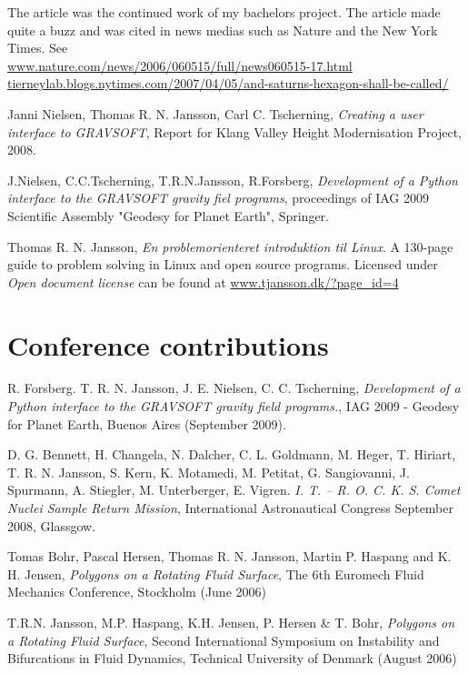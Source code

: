 \documentclass[margin,line,a4paper]{resume05}
\begin{document}
\begin{resume}
    The article was the continued work of my bachelors project. The
    article made quite a buzz and was cited in news medias such as Nature
    and the New York Times. See\\
    \href{http://www.nature.com/news/2006/060515/full/news060515-17.html}{www.nature.com/news/2006/060515/full/news060515-17.html}\\
    \href{http://tierneylab.blogs.nytimes.com/2007/04/05/and-saturns-hexagon-shall-be-called/}{tierneylab.blogs.nytimes.com/2007/04/05/and-saturns-hexagon-shall-be-called/}
    
    Janni Nielsen, Thomas R. N. Jansson, Carl C. Tscherning, \emph{Creating a user
    interface to GRAVSOFT}, Report for Klang Valley Height Modernisation
    Project, 2008. 
    
    J.Nielsen, C.C.Tscherning, T.R.N.Jansson, R.Forsberg,
    \emph{Development of a Python interface to the GRAVSOFT gravity
    fiel programs}, proceedings of IAG 2009 Scientific Assembly
    "Geodesy for Planet Earth", Springer. 
    
    Thomas R. N. Jansson, \emph{En problemorienteret introduktion til Linux}. A
    130-page guide to problem solving in Linux and open source programs. Licensed
    under \textit{Open document license} can be found at \url{www.tjansson.dk/?page_id=4}    


\section{ \mysidestyle Conference contributions}
    R. Forsberg. T. R. N. Jansson, J. E. Nielsen, C. C. Tscherning,
    \emph{Development of a Python interface to the GRAVSOFT gravity field
    programs.}, IAG 2009 - Geodesy for Planet Earth, Buenos Aires
    (September 2009).  

    D. G. Bennett, H. Changela, N. Dalcher, C. L. Goldmann, M. Heger, T.
    Hiriart, T. R. N. Jansson, S. Kern, K. Motamedi, M. Petitat, G.
    Sangiovanni, J. Spurmann, A. Stiegler, M. Unterberger, E. Vigren.
    \emph{I. T. -- R. O. C. K. S. Comet Nuclei Sample Return Mission}, International
    Astronautical Congress September 2008, Glassgow. 

    Tomas Bohr, Pascal Hersen, Thomas R. N. Jansson, Martin P. Haspang and K. H.
    Jensen, \emph{Polygons on a Rotating Fluid Surface}, The 6th Euromech Fluid Mechanics
    Conference, Stockholm (June 2006)

    T.R.N. Jansson, M.P. Haspang, K.H. Jensen, P. Hersen \& T. Bohr,
    \emph{Polygons on a
    Rotating Fluid Surface}, Second International Symposium on Instability and
    Bifurcations in Fluid Dynamics, Technical University of Denmark (August 2006)




\end{resume}
\end{document}
